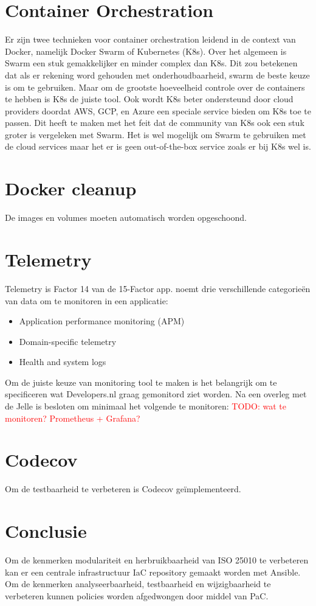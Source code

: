 \section{Container Orchestration}
Er zijn twee technieken voor container orchestration leidend in de context van Docker, namelijk Docker Swarm of Kubernetes (K8s). Over het algemeen is Swarm een stuk gemakkelijker en minder complex dan K8s. Dit zou betekenen dat als er rekening word gehouden met onderhoudbaarheid, swarm de beste keuze is om te gebruiken. Maar om de grootste hoeveelheid controle over de containers te hebben is K8s de juiste tool. Ook wordt K8s beter ondersteund door cloud providers doordat AWS, GCP, en Azure een speciale service bieden om K8s toe te passen. Dit heeft te maken met het feit dat de community van K8s ook een stuk groter is vergeleken met Swarm. Het is wel mogelijk om Swarm te gebruiken met de cloud services maar het er is geen out-of-the-box service zoals er bij K8s wel is.

\section{Docker cleanup}
De images en volumes moeten automatisch worden opgeschoond.

\section{Telemetry}
Telemetry is Factor 14 van de 15-Factor app. \parencite{Beyond12Factor} noemt drie verschillende categorieën van data om te monitoren in een applicatie:
\begin{itemize}
	\item Application performance monitoring (APM)
	\item Domain-specific telemetry
	\item Health and system logs
\end{itemize}

Om de juiste keuze van monitoring tool te maken is het belangrijk om te specificeren wat Developers.nl graag gemonitord ziet worden. Na een overleg met de Jelle is besloten om minimaal het volgende te monitoren:
\textcolor{red}{TODO: wat te monitoren? Prometheus + Grafana?} %

\section{Codecov}
Om de testbaarheid te verbeteren is Codecov geïmplementeerd.

\section{Conclusie}
Om de kenmerken modulariteit en herbruikbaarheid van ISO 25010 te verbeteren kan er een centrale infrastructuur IaC repository gemaakt worden met Ansible. Om de kenmerken analyseerbaarheid, testbaarheid en wijzigbaarheid te verbeteren kunnen policies worden afgedwongen door middel van PaC.